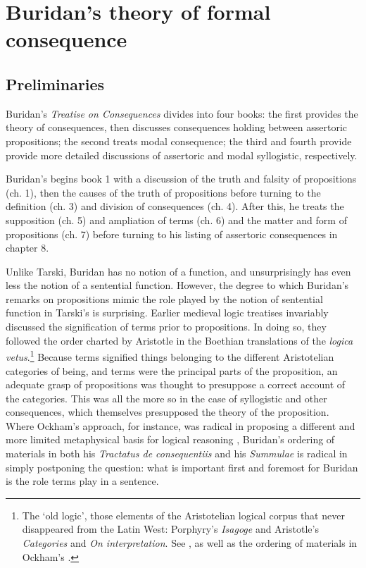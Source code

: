 \documentclass[]{article}
\begin{document}
\section{Buridan's theory of formal consequence}
\subsection{Preliminaries}
Buridan's \textit{Treatise on Consequences} divides into four books: the first provides the theory of consequences, then discusses consequences holding between assertoric propositions; the second treats modal consequence; the third and fourth provide provide more detailed discussions of assertoric and modal syllogistic, respectively. 

Buridan's begins book 1 with a discussion of the truth and falsity of propositions (ch. 1), then the causes of the truth of propositions before turning to the definition (ch. 3) and division of consequences (ch. 4). After this, he treats the supposition (ch. 5) and ampliation of terms (ch. 6) and the matter and form of propositions (ch. 7) before turning to his listing of assertoric consequences in chapter 8.

Unlike Tarski, Buridan has no notion of a function, and unsurprisingly has even less the notion of a sentential function. However, the degree to which Buridan's remarks on propositions mimic the role played by the notion of sentential function in Tarski's is surprising. Earlier medieval logic treatises invariably discussed the signification of terms prior to propositions. In doing so, they followed the order charted by Aristotle in the Boethian translations of the \textit{logica vetus}.\footnote{The `old logic', those elements of the Aristotelian logical corpus that never disappeared from the Latin West: Porphyry's \textit{Isagoge} and Aristotle's \textit{Categories} and \textit{On interpretation}. See \cite[in peri herm., prol.]{AquinasDI}, as well as the ordering of materials in Ockham's \cite{OckhamSLI}.} Because terms signified things belonging to the different Aristotelian categories of being, and terms were the principal parts of the proposition, an adequate grasp of propositions was thought to presuppose a correct account of the categories. This was all the more so in the case of syllogistic and other consequences, which themselves presupposed the theory of the proposition. Where Ockham's approach, for instance, was radical in proposing a different and more limited metaphysical basis for logical reasoning \cite{Read2007}, Buridan's ordering of materials in both his \textit{Tractatus de consequentiis} and his \textit{Summulae} is radical in simply postponing the question: what is important first and foremost for Buridan is the role terms play in a sentence.
\end{document}
